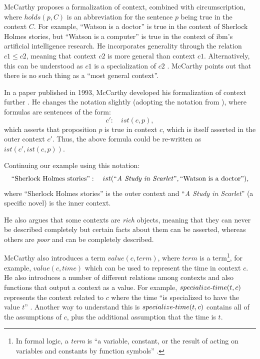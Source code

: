 McCarthy proposes a formalization of context, combined with circumscription, where $holds(p, C)$ is an abbreviation for the sentence $p$ being true in the context $C$. For example, ``Watson is a doctor'' is true in the context of Sherlock Holmes stories, but ``Watson is a computer'' is true in the context of \acrshort{ibm}'s artificial intelligence research. He incorporates generality through the relation $c1 \le c2$, meaning that context $c2$ is more general than context $c1$. Alternatively, this can be understood as $c1$ is a specialization of $c2$ \cite{akman1996steps}. McCarthy points out that there is no such thing as a ``most general context''.

In a paper published in 1993, McCarthy developed his formalization of context further \cite{McCarthy1993}. He changes the notation slightly (adopting the notation from \cite{guha1991contexts}), where formulas are sentences of the form:
\begin{equation}
  \label{eq:ist1}
 c': \quad	ist(c,p),
\end{equation}
which asserts that proposition $p$ is true in context $c$, which is itself asserted in the outer context $c'$. Thus, the above formula could be re-written as $ist(c', ist(c,p))$. 

Continuing our example using this notation:
\begin{equation}
  \label{eq:context1}
 \text{``Sherlock Holmes stories''}: \quad	ist(\text{``\emph{A Study in Scarlet}''},\text{``Watson is a doctor''}),
\end{equation}
where ``Sherlock Holmes stories'' is the outer context and ``\emph{A Study in Scarlet}'' (a specific novel) is the inner context.

He also argues that some contexts are \emph{rich} objects, meaning that they can never be described completely but certain facts about them can be asserted, whereas others are \emph{poor} and can be completely described.

McCarthy also introduces a term $value(c,term)$, where $term$ is a term\footnote{In formal logic, a \emph{term} is ``a variable, constant, or the result of acting on variables and constants by function symbols'' \cite{Weisstein2014}.}, for example, $value(c,time)$ which can be used to represent the time in context $c$. He also introduces a number of different relations among contexts and also functions that output a context as a value. For example, $specialize\textnormal{-}time(t, c)$ represents the context related to $c$ where the time ``is specialized to have the value $t$'' \cite{McCarthy1993}. Another way to understand this is $specialize\textnormal{-}time(t, c)$ contains all of the assumptions of $c$, plus the additional assumption that the time is $t$.


